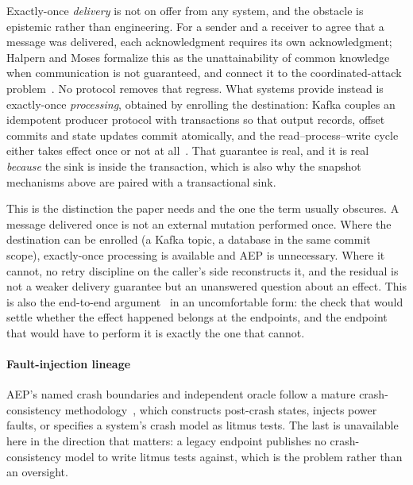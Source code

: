 Exactly-once \emph{delivery} is not on offer from any system, and the obstacle is
epistemic rather than engineering. For a sender and a receiver to agree that a
message was delivered, each acknowledgment requires its own acknowledgment;
Halpern and Moses formalize this as the unattainability of common knowledge when
communication is not guaranteed, and connect it to the coordinated-attack
problem~\cite{halpern1990knowledge}. No protocol removes that regress. What
systems provide instead is exactly-once \emph{processing}, obtained by enrolling
the destination: Kafka couples an idempotent producer protocol with transactions
so that output records, offset commits and state updates commit atomically, and
the read--process--write cycle either takes effect once or not at
all~\cite{wang2021kafka}. That guarantee is real, and it is real \emph{because}
the sink is inside the transaction, which is also why the snapshot mechanisms
above are paired with a transactional sink.

This is the distinction the paper needs and the one the term usually obscures. A
message delivered once is not an external mutation performed once. Where the
destination can be enrolled (a Kafka topic, a database in the same commit
scope), exactly-once processing is available and AEP is unnecessary. Where it
cannot, no retry discipline on the caller's side reconstructs it, and the
residual is not a weaker delivery guarantee but an unanswered question about an
effect. This is also the end-to-end argument~\cite{saltzer1984endtoend} in an
uncomfortable form: the check that would settle whether the effect happened
belongs at the endpoints, and the endpoint that would have to perform it is
exactly the one that cannot.

\paragraph{Fault-injection lineage} AEP's named crash boundaries and
independent oracle follow a mature crash-consistency
methodology~\cite{pillai2014alice,zheng2014torturing,mohan2018crashmonkey,bornholt2016ferrite},
which constructs post-crash states, injects power faults, or specifies a
system's crash model as litmus tests. The last is unavailable here in the
direction that matters: a legacy endpoint publishes no crash-consistency model
to write litmus tests against, which is the problem rather than an oversight.

